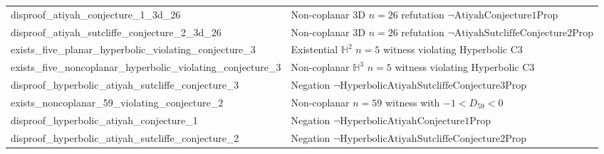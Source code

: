 \documentclass[11pt,reqno]{amsart}
\theoremstyle{remark}
\newcommand{\Hy}{\mathbb{H}}
\begin{document}
\begin{table}[htbp]
\begin{tabular}{>{\ttfamily\raggedright\arraybackslash}p{}>{\raggedright\arraybackslash}p{}}
disproof\_atiyah\_conjecture\_1\_3d\_26 & Non-coplanar 3D $n = 26$ refutation $\neg \mathrm{Atiyah\allowbreak Conjecture1Prop}$ \\
disproof\_atiyah\_sutcliffe\_conjecture\_2\_3d\_26 & Non-coplanar 3D $n = 26$ refutation $\neg \mathrm{Atiyah\allowbreak Sutcliffe\allowbreak Conjecture2Prop}$ \\
exists\_five\_planar\_hyperbolic\_violating\_conjecture\_3 & Existential $\Hy^2$ $n = 5$ witness violating Hyperbolic C3 \\
exists\_five\_noncoplanar\_hyperbolic\_violating\_conjecture\_3 & Non-coplanar $\Hy^3$ $n = 5$ witness violating Hyperbolic C3 \\
disproof\_hyperbolic\_atiyah\_sutcliffe\_conjecture\_3 & Negation $\neg \mathrm{Hyperbolic\allowbreak Atiyah\allowbreak Sutcliffe\allowbreak Conjecture3Prop}$ \\
exists\_noncoplanar\_59\_violating\_conjecture\_2 & Non-coplanar $n = 59$ witness with $-1 < D_{59} < 0$ \\
disproof\_hyperbolic\_atiyah\_conjecture\_1 & Negation $\neg \mathrm{Hyperbolic\allowbreak Atiyah\allowbreak Conjecture1Prop}$ \\
disproof\_hyperbolic\_atiyah\_sutcliffe\_conjecture\_2 & Negation $\neg \mathrm{Hyperbolic\allowbreak Atiyah\allowbreak Sutcliffe\allowbreak Conjecture2Prop}$ \\
\bottomrule
\end{tabular}
\end{table}
\end{document}
